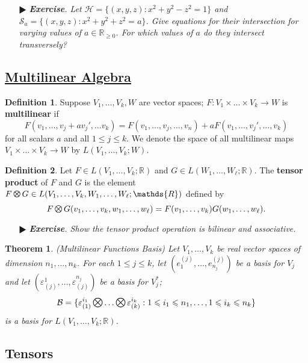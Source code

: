 \documentclass[11pt]{amsart}
\newtheorem*{theorem*}{Theorem}
\theoremstyle{definition}
\newtheorem*{definition*}{Definition}
\renewcommand\geq{\geqslant}
\renewcommand\leq{\leqslant}
\renewcommand\:{\colon}
\newcommand{\calB}{\mathcal{B}}
\newcommand{\calH}{\mathcal{H}}
\newcommand{\calS}{\mathcal{S}}
\newcommand{\R}{\mathds{R}}
\newcommand{\1}{\mathds{1}}
\DeclareMathOperator*{\motimes}{\text{\raisebox{0.25ex}{\scalebox{0.8}{$\bigotimes$}}}}
\DeclareMathOperator*{\Motimes}{\text{\raisebox{0.35ex}{\scalebox{0.6}{$\bigotimes$}}}}
\newcommand{\exc}[1]{\vspace{-2.5pt}\begin{itemize}[leftmargin=15pt]\item[$\RHD$] \textit{\textbf{Exercise}. #1}\end{itemize}}
\begin{document}
\exc{Let $\calH = \{(x,y,z) : x^2 + y^2 - z^2 = 1\}$ and $\calS_a = \{(x,y,z) : x^2 + y^2 + z^2 = a\}$. Give equations for their intersection for varying values of $a \in \R_{\geq0}$. For which values of $a$ do they intersect transversely?}

\vskip20pt



\subsection*{\underline{Multilinear Algebra}}

\begin{definition*}
	Suppose $V_1, \dots, V_k, W$ are vector spaces; $F\: V_1 \times \dots \times V_k \to W$ is \textbf{multilinear} if 
		\[ F(v_1, \dots, v_j + av_j', \dots v_k) = F(v_1, \dots, v_j, \dots, v_n) + aF(v_1, \dots, v_j', \dots, v_k) \]
	for all scalars $a$ and all $1 \leq j \leq k$. We denote the space of all multilinear maps $V_1 \times \dots \times V_k \to W$ by $L(V_1, \dots, V_k; W)$.
\end{definition*}

\begin{definition*}
	Let $F \in L(V_1, \dots , V_k; \R)$ and $G \in L(W_1, \dots, W_\ell; \R)$. The \textbf{tensor product} of $F$ and $G$ is the element $F \motimes G \in L(V_1, \dots, V_k, W_1, \dots, W_\ell; \R)$ defined by
		\[ F \Motimes G(v_1, \dots, v_k, w_1, \dots, w_\ell) = F(v_1, \dots, v_k)G(w_1, \dots, w_\ell). \]
\end{definition*}

\exc{Show the tensor product operation is bilinear and associative.}

\begin{theorem*}
	\textnormal{(Multilinear Functions Basis)} Let $V_1, \dots, V_k$ be real vector spaces of dimension $n_1, \dots, n_k$. For each $1 \leq j \leq k$, let $(e^{(j)}_1, \dots, e^{(j)}_{n_j})$ be a basis for $V_j$ and let $(\varepsilon^1_{(j)}, \dots, \varepsilon^{n_j}_{(j)})$ be a basis for $V_j^*$;
		\[ \calB = \{ \varepsilon^{i_1}_{(1)} \motimes \dots \motimes \varepsilon^{i_k}_{(k)} : 1 \leq i_1 \leq n_1, \dots, 1 \leq i_k \leq n_k\} \]
	is a basis for $L(V_1, \dots, V_k; \R)$. 
\end{theorem*}
\vskip20pt 

\subsection*{Tensors}
\end{document}
